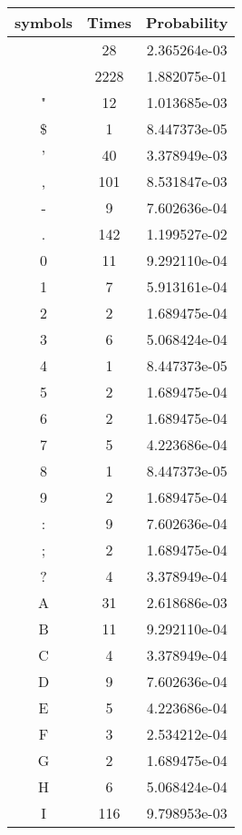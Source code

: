 \documentclass[12pt]{article} %
\numberwithin{equation}{section}
\begin{document}
\begin{table}[!hptb]
\begin{minipage}{.5\linewidth}
\centering
\begin{tabular}{ccc}  %
\hline
symbols  &Times  &Probability \\ \hline  %
         &28     &2.365264e-03\\                %
         &2228   &1.882075e-01\\                %
"        &12     &1.013685e-03\\
\$       &1      &8.447373e-05\\
'        &40     &3.378949e-03\\
,        &101    &8.531847e-03\\
-        &9      &7.602636e-04\\
.        &142    &1.199527e-02\\
0        &11     &9.292110e-04\\
1        &7      &5.913161e-04\\
2        &2      &1.689475e-04\\
3 		 &6      &5.068424e-04\\
4 		 &1      &8.447373e-05\\
5 		 &2      &1.689475e-04\\
6 		 &2      &1.689475e-04\\
7 		 &5      &4.223686e-04\\
8 		 &1      &8.447373e-05\\
9 		 &2      &1.689475e-04\\
: 		 &9      &7.602636e-04\\
; 		 &2      &1.689475e-04\\
? 		 &4      &3.378949e-04\\
A 		 &31     &2.618686e-03\\
B 		 &11     &9.292110e-04\\
C 		 &4      &3.378949e-04\\
D 		 &9      &7.602636e-04\\
E 		 &5      &4.223686e-04\\
F 		 &3      &2.534212e-04\\
G 		 &2      &1.689475e-04\\
H 		 &6      &5.068424e-04\\
I 		 &116    &9.798953e-03\\

\end{tabular}
\end{minipage}
\end{table}
\end{document}
